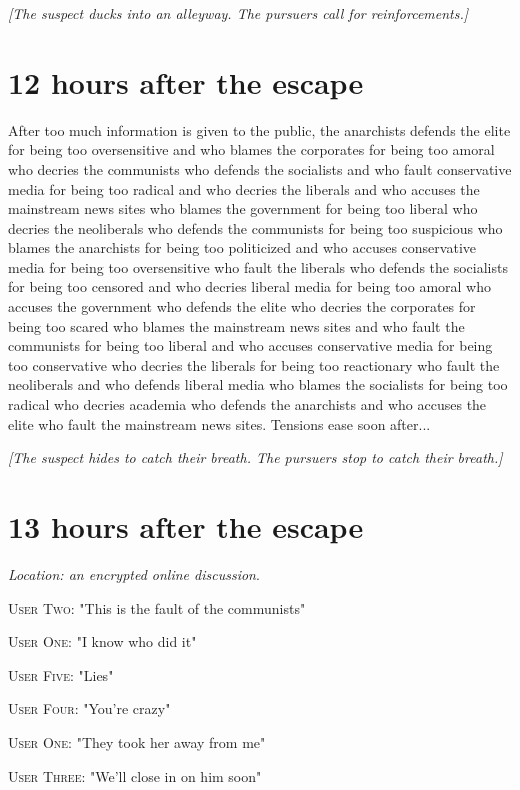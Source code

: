 \documentclass{report}
\begin{document}
\textit{[The suspect ducks into an alleyway. The pursuers call for reinforcements.]}


\section*{12 \small{hours after the escape}}

After too much information is given to the public, the anarchists defends the elite for being too oversensitive and who blames the corporates for being too amoral who decries the communists who defends the socialists and who fault conservative media for being too radical and who decries the liberals and who accuses the mainstream news sites who blames the government for being too liberal who decries the neoliberals who defends the communists for being too suspicious who blames the anarchists for being too politicized and who accuses conservative media for being too oversensitive who fault the liberals who defends the socialists for being too censored and who decries liberal media for being too amoral who accuses the government who defends the elite who decries the corporates for being too scared who blames the mainstream news sites and who fault the communists for being too liberal and who accuses conservative media for being too conservative who decries the liberals for being too reactionary who fault the neoliberals and who defends liberal media who blames the socialists for being too radical who decries academia who defends the anarchists and who accuses the elite who fault the mainstream news sites. Tensions ease soon after...

\textit{[The suspect hides to catch their breath. The pursuers stop to catch their breath.]}


\section*{13 \small{hours after the escape}}

\textit{Location: an encrypted online discussion}. 

\textsc{User Two}: "This is the fault of the communists" 

\textsc{User One}: "I know who did it" 

\textsc{User Five}: "Lies" 

\textsc{User Four}: "You're crazy" 

\textsc{User One}: "They took her away from me" 

\textsc{User Three}: "We'll close in on him soon" 
\end{document}
